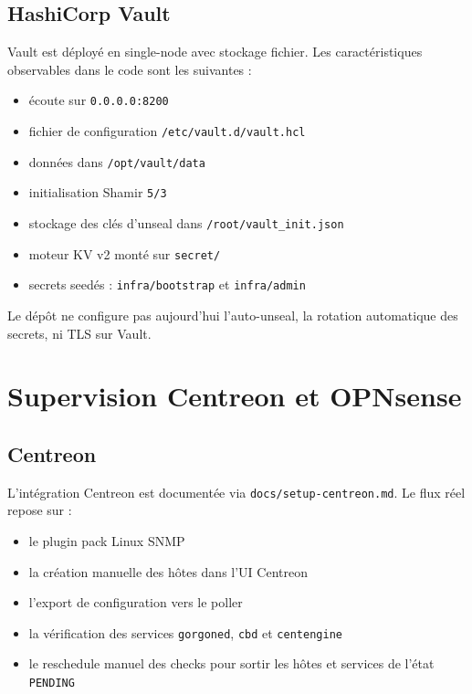 \documentclass[11pt,a4paper]{article}
\begin{document}
\subsection{HashiCorp Vault}

Vault est déployé en single-node avec stockage fichier. Les caractéristiques observables dans le code sont les suivantes :

\begin{itemize}
  \item écoute sur \texttt{0.0.0.0:8200}
  \item fichier de configuration \texttt{/etc/vault.d/vault.hcl}
  \item données dans \texttt{/opt/vault/data}
  \item initialisation Shamir \texttt{5/3}
  \item stockage des clés d'unseal dans \texttt{/root/vault\_init.json}
  \item moteur KV v2 monté sur \texttt{secret/}
  \item secrets seedés : \texttt{infra/bootstrap} et \texttt{infra/admin}
\end{itemize}

Le dépôt ne configure pas aujourd'hui l'auto-unseal, la rotation automatique des secrets, ni TLS sur Vault.

\section{Supervision Centreon et OPNsense}

\subsection{Centreon}

L'intégration Centreon est documentée via \texttt{docs/setup-centreon.md}. Le flux réel repose sur :

\begin{itemize}
  \item le plugin pack Linux SNMP
  \item la création manuelle des hôtes dans l'UI Centreon
  \item l'export de configuration vers le poller
  \item la vérification des services \texttt{gorgoned}, \texttt{cbd} et \texttt{centengine}
  \item le reschedule manuel des checks pour sortir les hôtes et services de l'état \texttt{PENDING}
\end{itemize}
\end{document}

